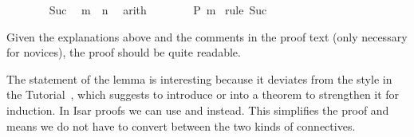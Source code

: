 \begin{isabellebody}
\ \ \ \ \ \ \isamarkupfalse%
\ Suc\ \isamarkupfalse%
\ {\isachardoublequoteopen}m\ {\isacharless}\ n{\isachardoublequoteclose}\ \isamarkupfalse%
\ arith\isanewline
\ \ \ \ \ \ \isamarkupfalse%
\ {\isachardoublequoteopen}P\ m{\isachardoublequoteclose}\ \isamarkupfalse%
{\isacharparenleft}rule\ Suc{\isacharparenright}\isanewline
\ \ \ \ \isamarkupfalse%
\isanewline
\ \ \isamarkupfalse%
\isanewline
{}\isamarkupfalse%
%
\endisatagproof
{\isafoldproof}%
%
\isadelimproof
%
\endisadelimproof
%
\begin{isamarkuptext}%
\noindent Given the explanations above and the comments in the
proof text (only necessary for novices), the proof should be quite
readable.

The statement of the lemma is interesting because it deviates from the style in
the Tutorial~\cite{LNCS2283}, which suggests to introduce \isa{{\isasymforall}} or
\isa{{\isasymlongrightarrow}} into a theorem to strengthen it for induction. In Isar
proofs we can use \isa{{\isasymAnd}} and \isa{{\isasymLongrightarrow}} instead. This simplifies the
proof and means we do not have to convert between the two kinds of
connectives.


\end{isamarkuptext}
\end{isabellebody}
